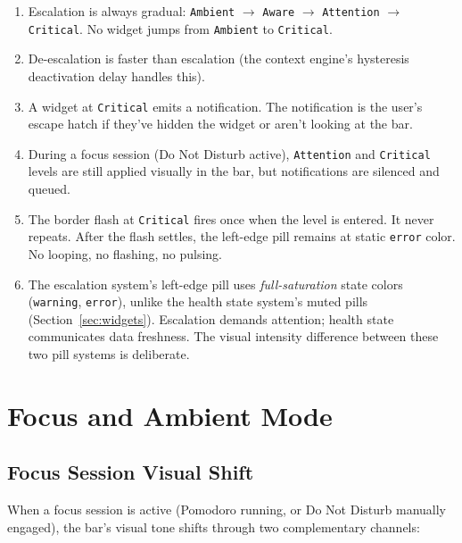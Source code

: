 \documentclass[11pt,a4paper]{article}
\begin{document}
\begin{enumerate}[leftmargin=1.5em, itemsep=3pt]
  \item Escalation is always gradual: \texttt{Ambient} $\to$ \texttt{Aware} $\to$ \texttt{Attention} $\to$ \texttt{Critical}. No widget jumps from \texttt{Ambient} to \texttt{Critical}.
  \item De-escalation is faster than escalation (the context engine's hysteresis deactivation delay handles this).
  \item A widget at \texttt{Critical} emits a notification. The notification is the user's escape hatch if they've hidden the widget or aren't looking at the bar.
  \item During a focus session (Do Not Disturb active), \texttt{Attention} and \texttt{Critical} levels are still applied visually in the bar, but notifications are silenced and queued.
  \item The border flash at \texttt{Critical} fires once when the level is entered. It never repeats. After the flash settles, the left-edge pill remains at static \texttt{error} color. No looping, no flashing, no pulsing.
  \item The escalation system's left-edge pill uses \emph{full-saturation} state colors (\texttt{warning}, \texttt{error}), unlike the health state system's muted pills (Section~\ref{sec:widgets}). Escalation demands attention; health state communicates data freshness. The visual intensity difference between these two pill systems is deliberate.
\end{enumerate}


\section{Focus and Ambient Mode}
\label{sec:focus}

\subsection{Focus Session Visual Shift}

When a focus session is active (Pomodoro running, or Do Not Disturb manually engaged), the bar's visual tone shifts through two complementary channels:
\end{document}
